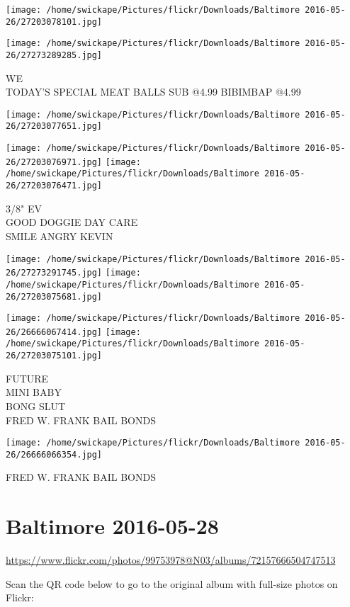 \documentclass[10pt,letterpaper]{article}
\begin{document}
\texttt{[image: /home/swickape/Pictures/flickr/Downloads/Baltimore 2016-05-26/27203078101.jpg]}

\vspace{0.25in}
\texttt{[image: /home/swickape/Pictures/flickr/Downloads/Baltimore 2016-05-26/27273289285.jpg]}

WE\\
TODAY'S SPECIAL MEAT BALLS SUB @4.99 BIBIMBAP @4.99
\pagebreak

\texttt{[image: /home/swickape/Pictures/flickr/Downloads/Baltimore 2016-05-26/27203077651.jpg]}

\vspace{0.25in}
\texttt{[image: /home/swickape/Pictures/flickr/Downloads/Baltimore 2016-05-26/27203076971.jpg]}
\texttt{[image: /home/swickape/Pictures/flickr/Downloads/Baltimore 2016-05-26/27203076471.jpg]}

3/8" EV\\
GOOD DOGGIE DAY CARE\\
SMILE ANGRY KEVIN
\pagebreak

\texttt{[image: /home/swickape/Pictures/flickr/Downloads/Baltimore 2016-05-26/27273291745.jpg]}
\texttt{[image: /home/swickape/Pictures/flickr/Downloads/Baltimore 2016-05-26/27203075681.jpg]}

\texttt{[image: /home/swickape/Pictures/flickr/Downloads/Baltimore 2016-05-26/26666067414.jpg]}
\texttt{[image: /home/swickape/Pictures/flickr/Downloads/Baltimore 2016-05-26/27203075101.jpg]}

FUTURE\\
MINI BABY\\
BONG SLUT\\
FRED W. FRANK BAIL BONDS
\pagebreak

\texttt{[image: /home/swickape/Pictures/flickr/Downloads/Baltimore 2016-05-26/26666066354.jpg]}

FRED W. FRANK BAIL BONDS
\pagebreak

\section*{Baltimore 2016-05-28}

\url{https://www.flickr.com/photos/99753978@N03/albums/72157666504747513}

Scan the QR code below to go to the original album with full-size photos on Flickr:
\end{document}
